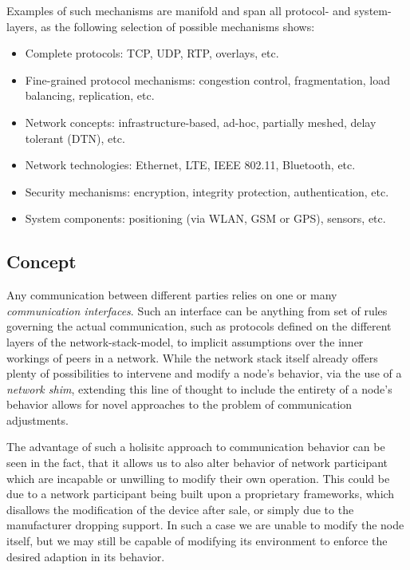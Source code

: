 Examples of such mechanisms are manifold and span all protocol- and system-layers, as the following selection of possible mechanisms shows:

\begin{itemize}
 \item Complete protocols: TCP, UDP, RTP, overlays, etc.
 \item Fine-grained protocol mechanisms: congestion control, fragmentation, load balancing, replication, etc.
 \item Network concepts: infrastructure-based, ad-hoc, partially meshed, delay tolerant (DTN), etc.
 \item Network technologies: Ethernet, LTE, IEEE 802.11, Bluetooth, etc.
 \item Security mechanisms: encryption, integrity protection, authentication, etc.
 \item System components: positioning (via WLAN, GSM or GPS), sensors, etc.
\end{itemize}

\subsection{Concept}
\label{sec:design:concept}

Any communication between different parties relies on one or many \textit{communication interfaces}.
Such an interface can be anything from set of rules governing the actual communication, such as protocols defined on the different layers of the network-stack-model, to implicit assumptions over the inner workings of peers in a network.
While the network stack itself already offers plenty of possibilities to intervene and modify a node's behavior, via the use of a \textit{network shim}, extending this line of thought to include the entirety of a node's behavior allows for novel approaches to the problem of communication adjustments.

The advantage of such a holisitc approach to communication behavior can be seen in the fact, that it allows us to also alter behavior of network participant which are incapable or unwilling to modify their own operation.
This could be due to a network participant being built upon a proprietary frameworks, which disallows the modification of the device after sale, or simply due to the manufacturer dropping support.
In such a case we are unable to modify the node itself, but we may still be capable of modifying its environment to enforce the desired adaption in its behavior.

